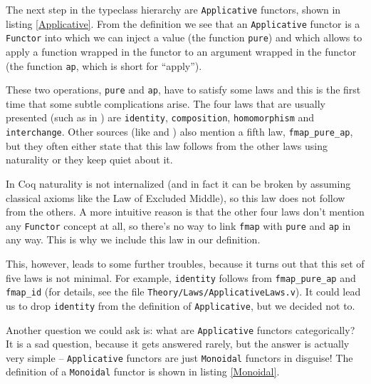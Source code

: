 \documentclass[declaration,inz,english,shortabstract]{iithesis}
\newcommand{\m}[1]{\texttt{#1}}
\begin{document}
The next step in the typeclass hierarchy are \m{Applicative} functors, shown in listing \ref{Applicative}. From the definition we see that an \m{Applicative} functor is a \m{Functor} into which we can inject a value (the function \m{pure}) and which allows to apply a function wrapped in the functor to an argument wrapped in the functor (the function \m{ap}, which is short for ``apply'').

These two operations, \m{pure} and \m{ap}, have to satisfy some laws and this is the first time that some subtle complications arise. The four laws that are usually presented (such as in \cite{LYAH}) are \m{identity}, \m{composition}, \m{homomorphism} and \m{interchange}. Other sources (like \cite{HackageApplicative} and \cite{WikibooksApplicative}) also mention a fifth law, \m{fmap\_pure\_ap}, but they often either state that this law follows from the other laws using naturality or they keep quiet about it.

In Coq naturality is not internalized (and in fact it can be broken by assuming classical axioms like the Law of Excluded Middle), so this law does not follow from the others. A more intuitive reason is that the other four laws don't mention any \m{Functor} concept at all, so there's no way to link \m{fmap} with \m{pure} and \m{ap} in any way. This is why we include this law in our definition.

This, however, leads to some further troubles, because it turns out that this set of five laws is not minimal. For example, \m{identity} follows from \m{fmap\_pure\_ap} and \m{fmap\_id} (for details, see the file \m{Theory/Laws/ApplicativeLaws.v}). It could lead us to drop \m{identity} from the definition of \m{Applicative}, but we decided not to.


Another question we could ask is: what are \m{Applicative} functors categorically? It is a sad question, because it gets answered rarely, but the answer is actually very simple -- \m{Applicative} functors are just \m{Monoidal} functors in disguise! The definition of a \m{Monoidal} functor is shown in listing \ref{Monoidal}. 
\end{document}

